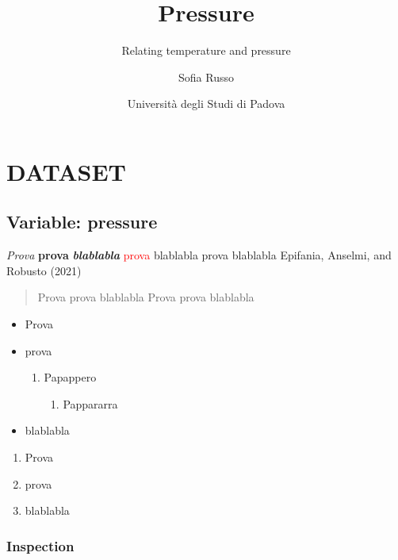 \documentclass[
]{article}
\title{Pressure}
\subtitle{Relating temperature and pressure}
\author{Sofia Russo}
\date{Università degli Studi di Padova}
\providecommand{\tightlist}{%
  \setlength{\itemsep}{0pt}\setlength{\parskip}{0pt}}
\begin{document}
\maketitle

{
\setcounter{tocdepth}{3}
\tableofcontents
}
\hypertarget{dataset}{%
\section{DATASET}\label{dataset}}

\hypertarget{variable-pressure}{%
\subsection{Variable: pressure}\label{variable-pressure}}

\emph{Prova} \textbf{prova} \textbf{\emph{blablabla}}
\textcolor{red}{prova} \color{red}\Huge blablabla
\normalsize \normalcolor prova \Huge blablabla \normalsize  Epifania,
Anselmi, and Robusto (2021)

\begin{quote}
Prova prova blablabla Prova prova blablabla
\end{quote}

\begin{itemize}
\tightlist
\item
  Prova
\item
  prova

  \begin{enumerate}
  \def\labelenumi{\arabic{enumi}.}
  \tightlist
  \item
    Papappero

    \begin{enumerate}
    \def\labelenumii{\arabic{enumii}.}
    \tightlist
    \item
      Pappararra
    \end{enumerate}
  \end{enumerate}
\item
  blablabla
\end{itemize}

\begin{enumerate}
\def\labelenumi{\arabic{enumi}.}
\tightlist
\item
  Prova
\item
  prova
\item
  blablabla
\end{enumerate}

\hypertarget{inspection}{%
\subsubsection{Inspection}\label{inspection}}
\end{document}
